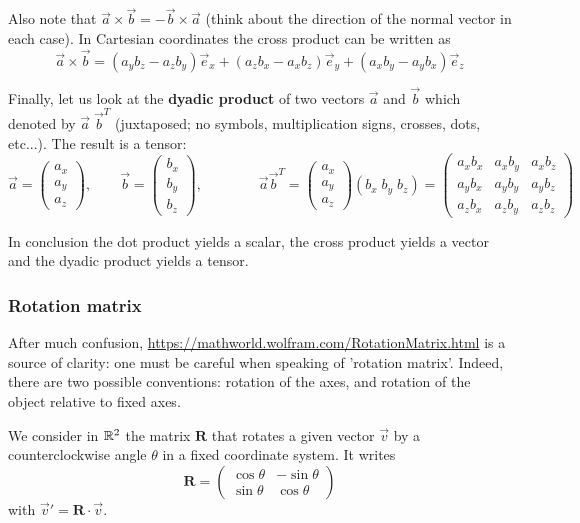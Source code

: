 Also note that $\vec{a} \times \vec{b} = - \vec{b} \times \vec{a}$ (think about the direction of the 
normal vector in each case). In Cartesian coordinates the cross product can be written as
\[
\vec{a} \times \vec{b} = (a_yb_z-a_zb_y) \vec{e}_x + (a_zb_x-a_xb_z) \vec{e}_y + (a_xb_y-a_yb_x) \vec{e}_z  
\]

Finally, let us look at the {\bf dyadic product} of two vectors $\vec{a}$ and $\vec{b}$ which denoted by
$\vec{a}\; \vec{b}^T$ (juxtaposed; no symbols, multiplication signs, crosses, dots, etc...). The 
result is a tensor:
\[
\vec{a}=
\left(
\begin{array}{c}
a_x \\ a_y \\ a_z
\end{array}
\right),
\qquad
\vec{b}=
\left(
\begin{array}{c}
b_x \\ b_y \\ b_z
\end{array}
\right),
\qquad\qquad
\vec{a}\vec{b}^T 
=
\left(
\begin{array}{c}
a_x \\ a_y \\ a_z
\end{array}
\right)
(b_x \; b_y \; b_z)
=
\left(
\begin{array}{ccc}
a_x b_x & a_xb_y & a_xb_z \\
a_y b_x & a_yb_y & a_yb_z \\
a_z b_x & a_zb_y & a_zb_z 
\end{array}
\right)
\]

In conclusion the dot product yields a scalar, the cross product yields a vector and the dyadic 
product yields a tensor. 






\subsubsection{Rotation matrix}

After much confusion, \url{https://mathworld.wolfram.com/RotationMatrix.html}
is a source of clarity: one must be careful when speaking of 'rotation matrix'.
Indeed, there are two possible conventions: rotation of the axes, and rotation 
of the object relative to fixed axes.

We consider in ${\mathbb{R}}^2$ the matrix ${\bm R}$ that rotates a given vector $\vec{v}$
by a counterclockwise angle $\theta$ in a fixed coordinate system.
It writes
\[
{\bm R}=
\left(
\begin{array}{cc}
\cos\theta & -\sin \theta \\
\sin\theta & \cos\theta
\end{array}
\right)
\]
with $\vec{v}'={\bm R}\cdot \vec{v}$.

